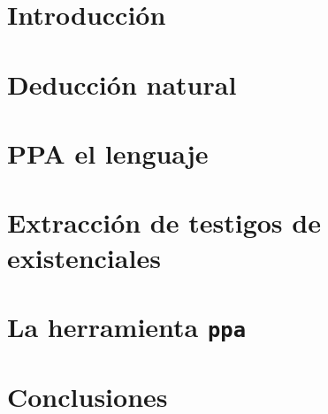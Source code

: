 \documentclass[11pt,a4paper]{tesis}
\begin{document}

\def\autor{Manuel Panichelli}
\def\tituloTesis{
PPA - Un asistente de demostración para lógica de primer orden con extracción de
testigos usando la traducción de Friedman
}
\def\runtitulo{PPA - Un asistente de demostración para lógica de primer orden
con extracción de testigos usando la traducción de Friedman}
\def\runtitle{PPA - a proof-assistant for first-order logic with witness extraction using Friedman's translation}
\def\director{Pablo Barenbaum}
\def\lugar{Buenos Aires, 2024}



\frontmatter
\pagestyle{empty}


\cleardoublepage


\cleardoublepage


\cleardoublepage
\tableofcontents

\mainmatter
\pagestyle{headings}


\chapter{Introducción}



\chapter{Deducción natural}



\chapter{PPA el lenguaje}



\chapter{Extracción de testigos de existenciales}



\chapter{La herramienta \texttt{ppa}}



\chapter{Conclusiones}



\backmatter
\printbibliography
\end{document}
